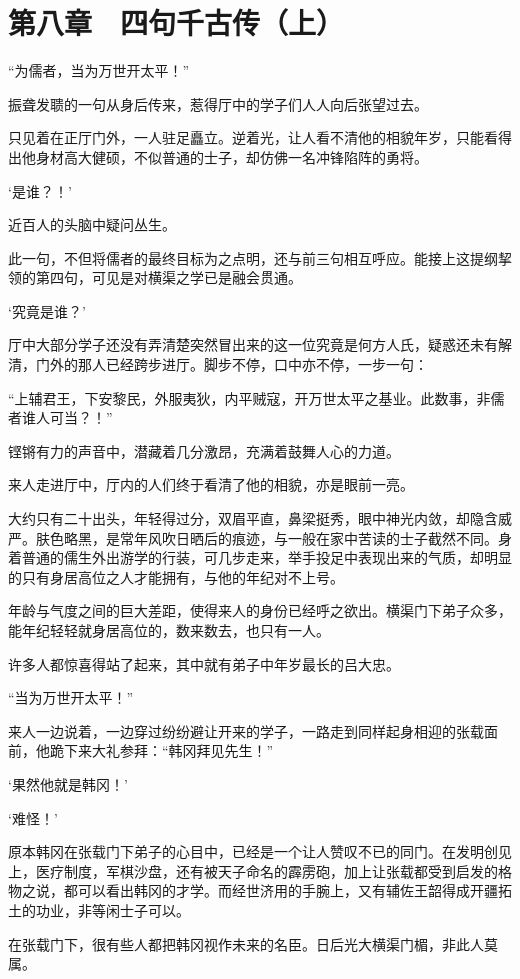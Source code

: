 \section{第八章　四句千古传（上）}

“为儒者，当为万世开太平！”

振聋发聩的一句从身后传来，惹得厅中的学子们人人向后张望过去。

只见着在正厅门外，一人驻足矗立。逆着光，让人看不清他的相貌年岁，只能看得出他身材高大健硕，不似普通的士子，却仿佛一名冲锋陷阵的勇将。

‘是谁？！’

近百人的头脑中疑问丛生。

此一句，不但将儒者的最终目标为之点明，还与前三句相互呼应。能接上这提纲挈领的第四句，可见是对横渠之学已是融会贯通。

‘究竟是谁？’

厅中大部分学子还没有弄清楚突然冒出来的这一位究竟是何方人氏，疑惑还未有解清，门外的那人已经跨步进厅。脚步不停，口中亦不停，一步一句：

“上辅君王，下安黎民，外服夷狄，内平贼寇，开万世太平之基业。此数事，非儒者谁人可当？！”

铿锵有力的声音中，潜藏着几分激昂，充满着鼓舞人心的力道。

来人走进厅中，厅内的人们终于看清了他的相貌，亦是眼前一亮。

大约只有二十出头，年轻得过分，双眉平直，鼻梁挺秀，眼中神光内敛，却隐含威严。肤色略黑，是常年风吹日晒后的痕迹，与一般在家中苦读的士子截然不同。身着普通的儒生外出游学的行装，可几步走来，举手投足中表现出来的气质，却明显的只有身居高位之人才能拥有，与他的年纪对不上号。

年龄与气度之间的巨大差距，使得来人的身份已经呼之欲出。横渠门下弟子众多，能年纪轻轻就身居高位的，数来数去，也只有一人。

许多人都惊喜得站了起来，其中就有弟子中年岁最长的吕大忠。

“当为万世开太平！”

来人一边说着，一边穿过纷纷避让开来的学子，一路走到同样起身相迎的张载面前，他跪下来大礼参拜：“韩冈拜见先生！”

‘果然他就是韩冈！’

‘难怪！’

原本韩冈在张载门下弟子的心目中，已经是一个让人赞叹不已的同门。在发明创见上，医疗制度，军棋沙盘，还有被天子命名的霹雳砲，加上让张载都受到启发的格物之说，都可以看出韩冈的才学。而经世济用的手腕上，又有辅佐王韶得成开疆拓土的功业，非等闲士子可以。

在张载门下，很有些人都把韩冈视作未来的名臣。日后光大横渠门楣，非此人莫属。

